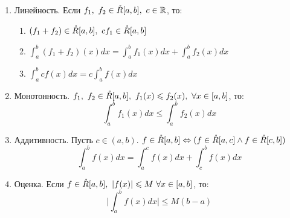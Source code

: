 \begin{theorem}
	\begin{enumerate}
		\item Линейность. Если $f_1,\ f_2\in\mathring R[a,b],\ c\in\mathbb{R}$, то:
		\begin{enumerate}
			\item $(f_1+f_2)\in\mathring R[a,b],\ cf_1\in\mathring R[a,b]$\\
			\item $\displaystyle\int_a^b(f_1+f_2)(x)dx=\int_a^bf_1(x)dx+\int_a^bf_2(x)dx$\\
			\item $\displaystyle\int_a^bcf(x)dx=c\int_a^bf(x)dx$
		\end{enumerate}
		\item Монотонность. $f_1,\ f_2\in\mc R[a,b],\ f_1(x)\le f_2(x),\ \forall x\in[a,b]$, то:
		\[\int_a^bf_1(x)dx\le\int_a^bf_2(x)dx\]
		\item Аддитивность. Пусть $c\in(a,b)$. $f\in\mathring R[a,b]\Leftrightarrow(f\in\mathring R[a,c]\land f\in\mathring R[c,b])$
		\[\int_a^bf(x)dx=\int_a^cf(x)dx+\int_c^bf(x)dx\]
		\item Оценка. Если $f\in\mc R[a,b],\ |f(x)|\le M\ \forall x\in[a,b]$, то:
		\[\bigg|\int_a^bf(x)dx\bigg|\le M(b-a)\]
	\end{enumerate}
\end{theorem}
